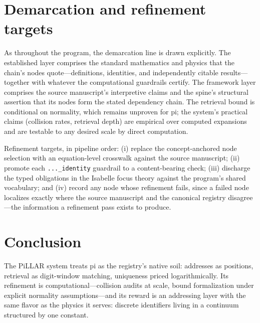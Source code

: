 \documentclass[11pt]{article}
\theoremstyle{remark}
\begin{document}
\section{Demarcation and refinement targets}
\label{sec:demarc}

As throughout the program, the demarcation line is drawn explicitly. The established layer comprises the standard mathematics and physics that the chain's nodes quote---definitions, identities, and independently citable results---together with whatever the computational guardrails certify. The framework layer comprises the source manuscript's interpretive claims and the spine's structural assertion that its nodes form the stated dependency chain. The retrieval bound is conditional on normality, which remains unproven for pi; the system's practical claims (collision rates, retrieval depth) are empirical over computed expansions and are testable to any desired scale by direct computation.

Refinement targets, in pipeline order: (i) replace the concept-anchored node selection with an equation-level crosswalk against the source manuscript; (ii) promote each \texttt{...\_identity} guardrail to a content-bearing check; (iii) discharge the typed obligations in the Isabelle focus theory against the program's shared vocabulary; and (iv) record any node whose refinement fails, since a failed node localizes exactly where the source manuscript and the canonical registry disagree---the information a refinement pass exists to produce.

\section{Conclusion}
\label{sec:conc}

The PiLLAR system treats pi as the registry's native soil: addresses as positions, retrieval as digit-window matching, uniqueness priced logarithmically. Its refinement is computational---collision audits at scale, bound formalization under explicit normality assumptions---and its reward is an addressing layer with the same flavor as the physics it serves: discrete identifiers living in a continuum structured by one constant.
\end{document}
